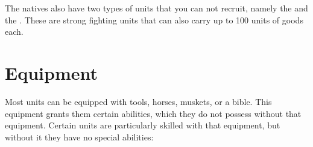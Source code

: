 \documentclass[12pt]{book}
\begin{document}
The natives also have two types of units that you can not recruit,
namely the  and the . These are
strong fighting units that can also carry up to 100 units of goods
each.


\hypertarget{Equipment}{\section{Equipment}}

Most units can be equipped with tools, horses, muskets, or a
bible. This equipment grants them certain abilities, which they do not
possess without that equipment. Certain units are particularly skilled
with that equipment, but without it they have no special abilities:
\end{document}
